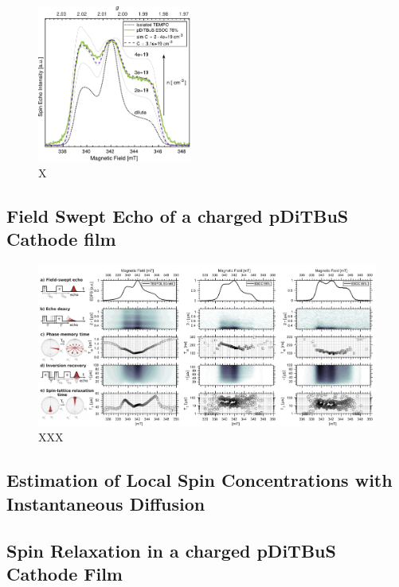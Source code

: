 \begin{figure}[h]
\center
	\includegraphics[width=0.45\textwidth]{./pulse/figures/Figure_4.pdf}
	\caption{X}
	\label{fig:FSE_with_ID_DiTBuS}
\end{figure}



\subsection{Field Swept Echo of a charged pDiTBuS Cathode film}
\begin{figure}[h]
\center
	\includegraphics[width=1\textwidth]{./pulse/figures/FSE_DTBS_FSE_RELAX_T1Tm.pdf}
	\caption{XXX}
	\label{fig:Figure_FSE2}
\end{figure}


\subsection{Estimation of Local Spin Concentrations with Instantaneous Diffusion}
\subsection{Spin Relaxation in a charged pDiTBuS Cathode Film}

